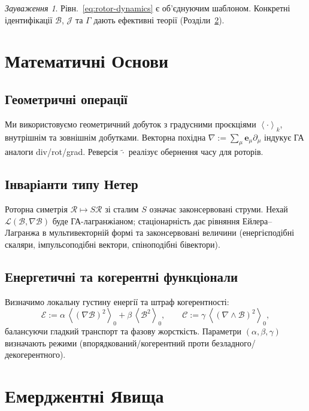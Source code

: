 \documentclass[11pt,a4paper]{article}
\newcommand{\e}{\mathbf{e}}
\newcommand{\grade}[2]{\left\langle #1 \right\rangle_{#2}}
\newcommand{\scal}[1]{\grade{#1}{0}}
\newcommand{\rev}[1]{\widetilde{#1}}           %
\newcommand{\Rotor}{\mathcal{R}}
\newcommand{\Biv}{\mathcal{B}}
\newcommand{\D}{\nabla}                        %
\theoremstyle{definition}
\theoremstyle{plain}
\theoremstyle{remark}
\newtheorem{remark}{Зауваження}
\begin{document}
\begin{remark}
Рівн.~\eqref{eq:rotor-dynamics} є об'єднуючим шаблоном. Конкретні ідентифікації $\Biv$, $\mathcal{J}$ та $\Gamma$ дають ефективні теорії (Розділи~\ref{sec:emergent}).
\end{remark}

\vspace{1em}

\section{Математичні Основи}
\subsection{Геометричні операції}
Ми використовуємо геометричний добуток з градусними проєкціями $\grade{\cdot}{k}$, внутрішнім та зовнішнім добутками. Векторна похідна $\D := \sum_\mu \e_\mu \partial_\mu$ індукує ГА аналоги div/rot/grad. Реверсія $\rev{\cdot}$ реалізує обернення часу для роторів.

\subsection{Інваріанти типу Нетер}
Роторна симетрія $\Rotor\mapsto S\Rotor$ зі сталим $S$ означає законсервовані струми. Нехай $\mathcal{L}(\Biv,\D\Biv)$ буде ГА-лагранжіаном; стаціонарність дає рівняння Ейлера--Лагранжа в мультивекторній формі та законсервовані величини (енергієподібні скаляри, імпульсоподібні вектори, спіноподібні бівектори).

\subsection{Енергетичні та когерентні функціонали}
Визначимо локальну густину енергії та штраф когерентності:
\begin{equation}
  \mathcal{E} := \alpha\, \scal{(\D \Biv)^2} + \beta\, \scal{\Biv^2},
  \qquad
  \mathcal{C} := \gamma\, \scal{(\D\wedge\Biv)^2},
\end{equation}
балансуючи гладкий транспорт та фазову жорсткість. Параметри $(\alpha,\beta,\gamma)$ визначають режими (впорядкований/когерентний проти безладного/декогерентного).

\vspace{1em}

\section{Емерджентні Явища}\label{sec:emergent}
\end{document}
